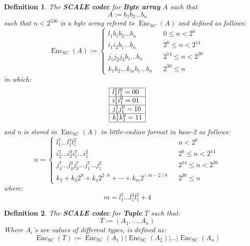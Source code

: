 \documentclass{article}
\newcommand{\assign}{:=}
\newcommand{\cdummy}{\cdot}
\newcommand{\nosymbol}{}
\newcommand{\tmop}[1]{\ensuremath{\operatorname{#1}}}
\newcommand{\tmstrong}[1]{\textbf{#1}}
\newcommand{\tmtextbf}[1]{{\bfseries{#1}}}
\newtheorem{definition}{Definition}
\providecommand{\cdummy}{{\cdot}}
\providecommand{\nosymbol}{}
\providecommand{\tmop}[1]{\ensuremath{\mathrm{#1}}}
\providecommand{\tmstrong}[1]{\tmtextbf{#1}}
\providecommand{\tmtextbf}[1]{\tmtextbf{#1}}
\newtheorem{definition}{Definition}
\begin{document}
\begin{definition}
  The {\tmstrong{SCALE codec}} for {\tmstrong{Byte array}} $A$ such that
  \[ A \assign b_1 b_2 \ldots b_n \]
  such that $n < 2^{536}$ is a byte array refered to $\tmop{Enc}_{\tmop{SC}}
  (A)$ and defined as follows:
  \[ \tmop{Enc}_{\tmop{SC}} (A) \assign \left\{ \begin{array}{lll}
       l^{\nosymbol}_1 b_1 b_2 \ldots b_n &  & 0 \leqslant n < 2^6\\
       i^{\nosymbol}_1 i^{\nosymbol}_2 b_1 \ldots b_n &  & 2^6 \leqslant n <
       2^{14}\\
       j^{\nosymbol}_1 j^{\nosymbol}_2 j_3 b_1 \ldots b_n &  & 2^{14}
       \leqslant n < 2^{30}\\
       k_1^{\nosymbol} k_2^{\nosymbol} \ldots k_m^{\nosymbol} b_1 \ldots b_n &
       & 2^{30} \leqslant n
     \end{array} \right. \]
  in which:{\hspace{0.17em}}
  \[ \begin{array}{|l|}
       \hline
       l^1_1 l_1^0 = 00\\
       \hline
       i^1_1 i_1^0 = 01\\
       \hline
       j^1_1 j_1^0 = 10\\
       \hline
       k^1_1 k_1^0 = 11\\
       \hline
     \end{array} \]
  and n is stored in $\tmop{Enc}_{\tmop{SC}} (A)$ in little-endian format in
  base-2 as follows:
  \[ n = \left\{ \begin{array}{lll}
       l^7_1 \ldots l^3_1 l^2_1 &  & n < 2^6\\
       i_2^7 \ldots i_2^0 i_1^7 \ldots i^2_1^{\nosymbol} &  & 2^6 \leqslant n
       < 2^{14}\\
       j_4^7 \ldots j_4^0 j_3^7 \ldots j_1^7 \ldots j^2_1 &  & 2^{14}
       \leqslant n < 2^{30}\\
       k_2 + k_3 2^8 + k_4 2^{2 \cdummy 8} + \cdots + k_m 2^{(m - 2) 8} &  &
       2^{30} \leqslant n
     \end{array} \right. \]
  where:
  \[ m = l^7_1 \ldots l^3_1 l^2_1 + 4 \]
\end{definition}

\begin{definition}
  The {\tmstrong{SCALE codec}} for {\tmstrong{Tuple}} $T$ such that:
  \[ T \assign (A_1, \ldots, A_n) \]
  Where $A_i$'s are values of different types, is defined as:
  \[ \tmop{Enc}_{\tmop{SC}} (T) \assign \tmop{Enc}_{\tmop{SC}} (A_1) |
     \tmop{Enc}_{\tmop{SC}} (A_2) | \ldots | \tmop{Enc}_{\tmop{SC}} (A_n) \]
\end{definition}
\end{document}
